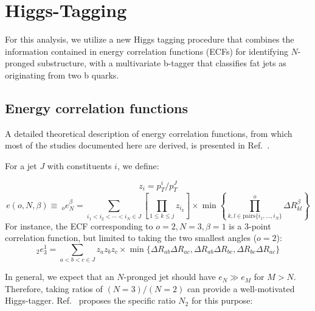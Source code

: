 \clearpage
\section{Higgs-Tagging}
\label{sec:higgstagging}

For this analysis, we utilize a new Higgs tagging procedure that combines the information contained in energy correlation functions (ECFs) for identifying $N$-pronged substructure, with a multivariate b-tagger that classifies fat jets as originating from two b quarks. %

\subsection{Energy correlation functions}
A detailed theoretical description of energy correlation functions,
from which most of the studies documented here are derived, is
presented in Ref.~\cite{ecf}.


For a jet $J$ with constituents $i$, we define:

\begin{equation}
  z_i = {p_T^i}\Big/{p_T^J}
\end{equation}
\begin{equation}
  e(o,N,\beta) \equiv ~_o e_N^\beta = \sum _{i_1<i_2<\cdots<i_N \in J}  \left[\prod_{1\leq k \leq j} z_{i_k}\right] \times \min\left\{\prod_{k,l\in \text{pairs}\{i_1,\dots,i_N\}}^o \Delta R_{kl}^\beta\right\} 
\end{equation}
For instance, the ECF corresponding to $o=2, N=3, \beta=1$ is a
3-point correlation function, but limited to taking the two smallest
angles ($o=2$):
\begin{equation}
  _2e_3^1 =  \sum _{a<b<c \in J}  z_az_bz_c \times \min\{\Delta R_{ab}\Delta R_{ac},\Delta R_{ab}\Delta R_{bc},\Delta R_{bc}\Delta R_{ac}\}
\end{equation}

In general, we expect that an $N$-pronged jet should have $e_N \gg
e_M$ for $M>N$. Therefore, taking ratios of $(N=3)/(N=2)$ can provide a well-motivated Higgs-tagger. Ref.~\cite{ecf} proposes the specific ratio $N_2$ for this purpose:

